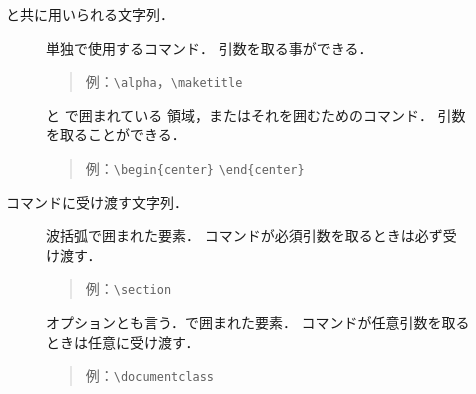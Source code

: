 {{{{{\begin{description}%
\item[] 
   と共に用いられる文字列．
   \begin{description}%
    \item[]
       単独で使用するコマンド．
       引数を取る事ができる．
    \begin{quote}例：\verb|\alpha|，\verb|\maketitle|
          \end{quote}
    \item[] 
       と
       で囲まれている
     領域，またはそれを囲むためのコマンド．
       引数を取ることができる．
     \begin{quote}例：\verb|\begin{center}|  \verb|\end{center}|
    \end{quote}
   \end{description}
 \item[] 
%
%
   コマンドに受け渡す文字列．
   \begin{description}%
    \item[] 
%
%
%
%
       {波括弧}で囲まれた要素．
       コマンドが必須引数を取るときは必ず受け渡す．
           \begin{quote}例：\verb|\section|\end{quote}
   \item[] 
%
%
%
       オプションとも言う．\qu{\texttt{[~]}}で囲まれた要素．
       コマンドが任意引数を取るときは任意に受け渡す．
          \begin{quote}例：\verb|\documentclass|
    \end{quote}
   \end{description}

\end{description}}}}}}
